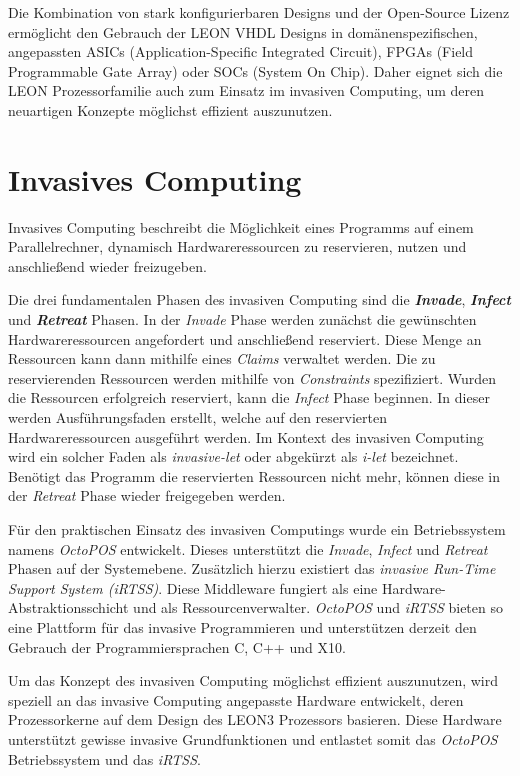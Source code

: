 Die Kombination von stark konfigurierbaren Designs und der Open-Source Lizenz ermöglicht den Gebrauch der
LEON VHDL Designs in domänenspezifischen, angepassten ASICs (Application-Specific Integrated Circuit),
FPGAs (Field Programmable Gate Array) oder SOCs (System On Chip). Daher eignet sich die LEON Prozessorfamilie
auch zum Einsatz im invasiven Computing, um deren neuartigen Konzepte möglichst effizient auszunutzen.
\cite{sparcv8Eval}

\section{Invasives Computing}

Invasives Computing beschreibt die Möglichkeit eines Programms auf einem Parallelrechner,
dynamisch Hardwareressourcen zu reservieren, nutzen und anschließend wieder freizugeben.\cite{octopos}

Die drei fundamentalen Phasen des invasiven Computing sind die \textit{\textbf{Invade}}, \textit{\textbf{Infect}}
und \textit{\textbf{Retreat}} Phasen. In der \textit{Invade} Phase werden zunächst die gewünschten
Hardwareressourcen angefordert und anschließend reserviert. Diese Menge an Ressourcen kann dann mithilfe
eines \textit{Claims} verwaltet werden. Die zu reservierenden Ressourcen werden mithilfe von \textit{Constraints}
spezifiziert.
Wurden die Ressourcen erfolgreich reserviert, kann die \textit{Infect}
Phase beginnen. In dieser werden Ausführungsfaden erstellt,
welche auf den reservierten Hardwareressourcen ausgeführt werden. Im Kontext des invasiven Computing wird ein solcher
Faden als \textit{invasive-let} oder abgekürzt als \textit{i-let} bezeichnet\cite{invasiveCommonTerms}.
Benötigt das Programm die reservierten Ressourcen nicht mehr, können diese in der \textit{Retreat} Phase wieder
freigegeben werden.\cite{octopos}

Für den praktischen Einsatz des invasiven Computings wurde ein Betriebssystem namens \textit{OctoPOS} entwickelt. 
Dieses unterstützt die \textit{Invade}, \textit{Infect} und \textit{Retreat} Phasen auf der Systemebene.
Zusätzlich hierzu existiert das \textit{invasive Run-Time Support System (iRTSS)}. Diese Middleware
fungiert als eine Hardware-Abstraktionsschicht und als Ressourcenverwalter.
\textit{OctoPOS} und \textit{iRTSS} bieten so eine Plattform für das invasive Programmieren und
unterstützen derzeit den Gebrauch der Programmiersprachen C, C++ und X10.
\cite{octopos}\cite{invasiveManyCore}\cite{invasiveRISC}

Um das Konzept des invasiven Computing möglichst effizient auszunutzen, wird speziell an das invasive Computing
angepasste Hardware entwickelt, deren Prozessorkerne auf dem Design des LEON3 Prozessors basieren.
Diese Hardware unterstützt gewisse invasive Grundfunktionen und entlastet somit das \textit{OctoPOS} Betriebssystem
und das \textit{iRTSS}.\cite{invasiveArrays}

